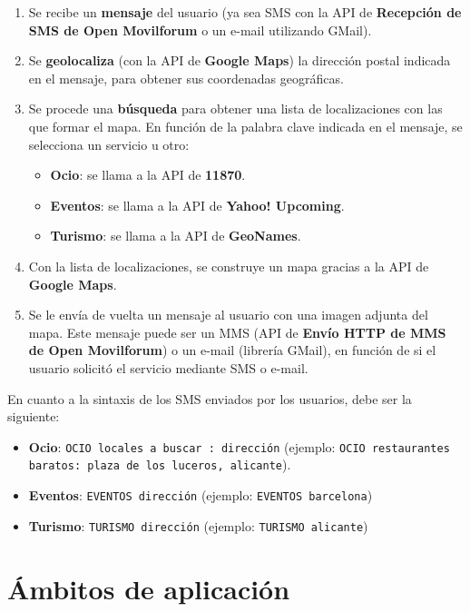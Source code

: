 \documentclass[11pt, a4paper, oneside]{article}
\begin{document}
\begin{enumerate}
	\item Se recibe un \textbf{mensaje} del usuario (ya sea SMS con la API de \textbf{Recepción de SMS de Open Movilforum} o un e-mail utilizando GMail).
	\item Se \textbf{geolocaliza} (con la API de \textbf{Google Maps}) la dirección postal indicada en el mensaje, para obtener sus coordenadas geográficas.
	\item Se procede una \textbf{búsqueda} para obtener una lista de localizaciones con las que formar el mapa. En función de la palabra clave indicada en el mensaje, se selecciona un servicio u otro:
	\begin{itemize}
		\item \textbf{Ocio}: se llama a la API de \textbf{11870}.
		\item \textbf{Eventos}: se llama a la API de \textbf{Yahoo! Upcoming}.
		\item \textbf{Turismo}: se llama a la API de \textbf{GeoNames}.
	\end{itemize}
	\item Con la lista de localizaciones, se construye un mapa gracias a la API de \textbf{Google Maps}.
	\item Se le envía de vuelta un mensaje al usuario con una imagen adjunta del mapa. Este mensaje puede ser un MMS (API de \textbf{Envío HTTP de MMS de Open Movilforum}) o un e-mail (librería GMail), en función de si el usuario solicitó el servicio mediante SMS o e-mail.
\end{enumerate}

En cuanto a la sintaxis de los SMS enviados por los usuarios, debe ser la siguiente:

\begin{itemize}
	\item \textbf{Ocio}: \texttt{OCIO locales a buscar~: dirección} (ejemplo: \texttt{OCIO restaurantes baratos: plaza de los luceros, alicante}).
	\item \textbf{Eventos}: \texttt{EVENTOS dirección} (ejemplo: \texttt{EVENTOS barcelona})
	\item \textbf{Turismo}: \texttt{TURISMO dirección} (ejemplo: \texttt{TURISMO alicante})
\end{itemize}


\section{Ámbitos de aplicación} %
\label{sec:Ámbitos_de_aplicación}
\end{document}
